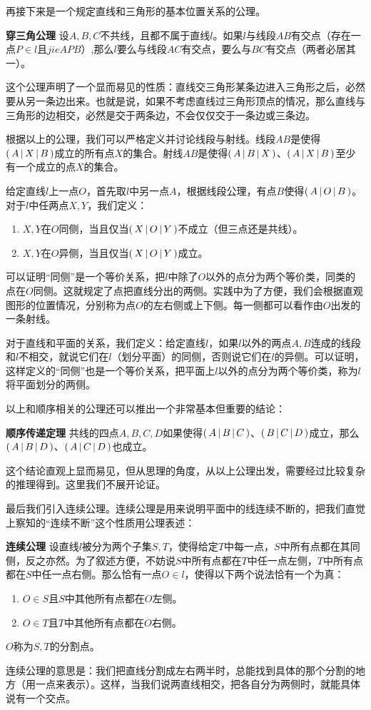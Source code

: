 \documentclass[12pt,UTF8]{ctexbook}
\begin{document}
\begin{appendix}
再接下来是一个规定直线和三角形的基本位置关系的公理。
\begin{po}{\textbf{穿三角公理}}\label{po:1-4}
    设$A,B,C$不共线，且都不属于直线$l$。如果$l$与线段$AB$有交点（存在一点$P\in l$且$jie{A}{P}{B}$）,那么$l$要么与线段$AC$有交点，要么与$BC$有交点（两者必居其一）。
\end{po}
这个公理声明了一个显而易见的性质：直线交三角形某条边进入三角形之后，必然要从另一条边出来。也就是说，如果不考虑直线过三角形顶点的情况，那么直线与三角形的边相交，必然是交于两条边，不会仅仅交于一条边或三条边。

根据以上的公理，我们可以严格定义并讨论线段与射线。线段$AB$是使得$\displaystyle\left( \,A \,\middle\vert \,X\,\middle\vert \,B \,\right)$成立的所有点$X$的集合。射线$AB$是使得$\displaystyle\left( \,A \,\middle\vert \,B\,\middle\vert \,X \,\right)$、$\displaystyle\left( \,A \,\middle\vert \,X\,\middle\vert \,B \,\right)$至少有一个成立的点$X$的集合。

给定直线$l$上一点$O$，首先取$l$中另一点$A$，根据线段公理，有点$B$使得$\displaystyle\left( \,A \,\middle\vert \,O\,\middle\vert \,B \,\right)$。对于$l$中任两点$X,Y$，我们定义：
\begin{enumerate}
    \item $X,Y$在$O$同侧，当且仅当$\displaystyle\left( \,X \,\middle\vert \,O\,\middle\vert \,Y \,\right)$不成立（但三点还是共线）。
    \item $X,Y$在$O$异侧，当且仅当$\displaystyle\left( \,X \,\middle\vert \,O\,\middle\vert \,Y \,\right)$成立。
\end{enumerate}
可以证明“同侧”是一个等价关系，把$l$中除了$O$以外的点分为两个等价类，同类的点在$O$同侧。这就规定了点把直线分出的两侧。实践中为了方便，我们会根据直观图形的位置情况，分别称为点$O$的左右侧或上下侧。每一侧都可以看作由$O$出发的一条射线。

对于直线和平面的关系，我们定义：给定直线$l$，如果$l$以外的两点$A,B$连成的线段和$l$不相交，就说它们在$l$（划分平面）的同侧，否则说它们在$l$的异侧。可以证明，这样定义的“同侧”也是一个等价关系，把平面上$l$以外的点分为两个等价类，称为$l$将平面划分的两侧。

以上和顺序相关的公理还可以推出一个非常基本但重要的结论：
\begin{tm}{\textbf{顺序传递定理}}\label{tm:a-0}
    共线的四点$A,B,C,D$如果使得$\displaystyle\left( \,A \,\middle\vert \,B\,\middle\vert \,C \,\right)$、$\displaystyle\left( \,B \,\middle\vert \,C\,\middle\vert \,D \,\right)$成立，那么$\displaystyle\left( \,A \,\middle\vert \,B\,\middle\vert \,D \,\right)$、$\displaystyle\left( \,A \,\middle\vert \,C\,\middle\vert \,D \,\right)$也成立。
\end{tm}
这个结论直观上显而易见，但从思理的角度，从以上公理出发，需要经过比较复杂的推理得到。这里我们不展开论证。

最后我们引入连续公理。连续公理是用来说明平面中的线连续不断的，把我们直觉上察知的“连续不断”这个性质用公理表述：
\begin{po}{\textbf{连续公理}}\label{po:1-5}
    设直线$l$被分为两个子集$S,T$，使得给定$T$中每一点，$S$中所有点都在其同侧，反之亦然。为了叙述方便，不妨说$S$中所有点都在$T$中任一点左侧，$T$中所有点都在$S$中任一点右侧。那么恰有一点$O\in l$，使得以下两个说法恰有一个为真：
    \begin{enumerate}
        \item $O\in S$且$S$中其他所有点都在$O$左侧。
        \item $O\in T$且$T$中其他所有点都在$O$右侧。
    \end{enumerate}
    $O$称为$S,T$的分割点。
\end{po}
连续公理的意思是：我们把直线分割成左右两半时，总能找到具体的那个分割的地方（用一点来表示）。这样，当我们说两直线相交，把各自分为两侧时，就能具体说有一个交点。


\end{appendix}
\end{document}
